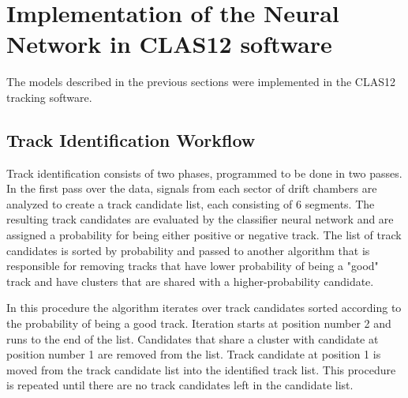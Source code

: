 \section{Implementation of the Neural Network in CLAS12 software}

The models described in the previous sections were implemented in the CLAS12 tracking software. 

\subsection{Track Identification Workflow}

 Track identification consists of two phases, programmed to be done in two passes. In the first pass 
 over the data, signals from each sector of drift chambers are analyzed to create a track candidate list, 
 each consisting of 6 segments. The resulting track candidates are evaluated by the classifier neural 
 network and are assigned a probability for being either positive or negative track. The list of track 
 candidates is sorted by probability and passed to another algorithm that is responsible for removing 
 tracks that have lower probability of being a "good" track and have clusters that are shared with a 
 higher-probability candidate. 

In this procedure the algorithm iterates over track candidates sorted according to the probability of 
being a good track. Iteration starts at position number 2 and runs to the end of the list. Candidates that 
share a cluster with candidate at position number 1 are removed from the list. Track candidate at position 
1 is moved from the track candidate list into the identified track list. This procedure is repeated until 
there are no track candidates left in the candidate list.

